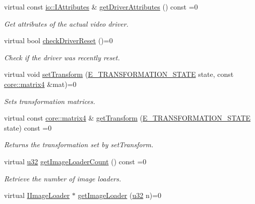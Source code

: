 \begin{DoxyCompactItemize}
virtual const \hyperlink{classirr_1_1io_1_1IAttributes}{io\+::\+I\+Attributes} \& \hyperlink{classirr_1_1video_1_1IVideoDriver_a2b43d2215f2e5aad9b4f92aa635bcc85}{get\+Driver\+Attributes} () const =0
\begin{DoxyCompactList}\small\item\em Get attributes of the actual video driver. \end{DoxyCompactList}\item 
virtual bool \hyperlink{classirr_1_1video_1_1IVideoDriver_a4ba84ee992939fc913d4935caffce87b}{check\+Driver\+Reset} ()=0
\begin{DoxyCompactList}\small\item\em Check if the driver was recently reset. \end{DoxyCompactList}\item 
virtual void \hyperlink{classirr_1_1video_1_1IVideoDriver_aaf6e88bedf7b91666a2bd34f46e092fc}{set\+Transform} (\hyperlink{namespaceirr_1_1video_a15b57657a320243be03ae6f66fcff43d}{E\+\_\+\+T\+R\+A\+N\+S\+F\+O\+R\+M\+A\+T\+I\+O\+N\+\_\+\+S\+T\+A\+TE} state, const \hyperlink{namespaceirr_1_1core_a73fa92e638c5ca97efd72da307cc9b65}{core\+::matrix4} \&mat)=0
\begin{DoxyCompactList}\small\item\em Sets transformation matrices. \end{DoxyCompactList}\item 
virtual const \hyperlink{namespaceirr_1_1core_a73fa92e638c5ca97efd72da307cc9b65}{core\+::matrix4} \& \hyperlink{classirr_1_1video_1_1IVideoDriver_a85c7d04aee02c2d5d8102279f9233101}{get\+Transform} (\hyperlink{namespaceirr_1_1video_a15b57657a320243be03ae6f66fcff43d}{E\+\_\+\+T\+R\+A\+N\+S\+F\+O\+R\+M\+A\+T\+I\+O\+N\+\_\+\+S\+T\+A\+TE} state) const =0
\begin{DoxyCompactList}\small\item\em Returns the transformation set by set\+Transform. \end{DoxyCompactList}\item 
virtual \hyperlink{namespaceirr_a0416a53257075833e7002efd0a18e804}{u32} \hyperlink{classirr_1_1video_1_1IVideoDriver_a92535921ad01c90570533ba60b0b76b2}{get\+Image\+Loader\+Count} () const =0
\begin{DoxyCompactList}\small\item\em Retrieve the number of image loaders. \end{DoxyCompactList}\item 
virtual \hyperlink{classirr_1_1video_1_1IImageLoader}{I\+Image\+Loader} $\ast$ \hyperlink{classirr_1_1video_1_1IVideoDriver_a5cc08e7cd2ce2a30275e22ce13bb1013}{get\+Image\+Loader} (\hyperlink{namespaceirr_a0416a53257075833e7002efd0a18e804}{u32} n)=0

\end{DoxyCompactItemize}
